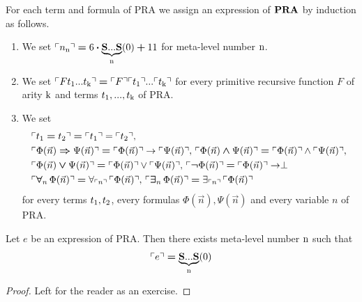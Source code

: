 \documentclass[10pt]{amsart}
\newcommand{\godel}[1]{\ulcorner #1 \urcorner}
\newcommand{\mforall}{\boldsymbol{\forall}}
\newcommand{\mexists}{\boldsymbol{\exists}}
\newcommand{\mra}{\boldsymbol{\Rightarrow}}
\newcommand{\mand}{\boldsymbol{\wedge}}
\newcommand{\mor}{\boldsymbol{\vee}}
\newcommand{\mneg}{\boldsymbol{\neg}}
\newcommand{\meq}{\boldsymbol{=}}
\newcommand{\mplus}{\boldsymbol{+}}
\newcommand{\mdot}{\boldsymbol{\cdot}}
\begin{document}
\begin{definition}
	For each term and formula of $\mathrm{PRA}$ we assign an expression of $\mathbf{PRA}$ by induction as follows.
	\begin{enumerate}[label=\textbf{(\arabic*)}, leftmargin=3.0em]
		\item We set $\godel{n_{\rm{n}}} \meq 6\mdot \underbrace{\bd{S}...\bd{S}}_{\rm{n}}(0) \mplus 11$ for meta-level number $\rm{n}$.
		\item We set $\godel{Ft_{\rm{1}}...t_{\rm{k}}} \meq \godel{F}\godel{t_{\rm{1}}}...\godel{t_{\rm{k}}}$ for every primitive recursive function $F$ of arity $\rm{k}$ and terms $t_{\rm{1}},...,t_{\rm{k}}$ of $\mathrm{PRA}$.
		\item We set
		      $$\begin{aligned}[t]
				       & \godel{t_{\rm{1}} \meq t_{\rm{2}}} \meq \godel{t_{\rm{1}}}=\godel{t_{\rm{2}}},                                                                                                                   \\
				       & \godel{\Phi(\vec{n})\mra \Psi(\vec{n})} \meq \godel{\Phi(\vec{n})}\ra \godel{\Psi(\vec{n})},\,\godel{\Phi(\vec{n}) \mand \Psi(\vec{n})} \meq \godel{\Phi(\vec{n})} \wedge \godel{\Psi(\vec{n})}, \\
				       & \godel{\Phi(\vec{n}) \mor \Psi(\vec{n})} \meq \godel{\Phi(\vec{n})} \vee \godel{\Psi(\vec{n})},\,\godel{\mneg \Phi(\vec{n})} \meq \godel{\Phi(\vec{n})} \ra \perp                                \\
				       & \godel{\mforall_n\,\Phi(\vec{n})} \meq \forall_{\godel{n}}\,\godel{\Phi(\vec{n})},\,\godel{\mexists_n\,\Phi(\vec{n})} \meq \exists_{\godel{n}}\,\godel{\Phi(\vec{n})}                            \\
			      \end{aligned}$$
		      for every terms $t_{\rm{1}},t_{\rm{2}}$, every formulas $\Phi(\vec{n}),\Psi(\vec{n})$ and every variable $n$ of $\mathrm{PRA}$.
	\end{enumerate}
\end{definition}

\begin{fact}\label{fact:each_godel_code_is_meta_numeral}
	Let $e$ be an expression of $\mathrm{PRA}$. Then there exists meta-level number $\rm{n}$ such that
	$$\godel{e} \meq \underbrace{\bd{S}...\bd{S}}_{\rm{n}}(0)$$
\end{fact}
\begin{proof}
	Left for the reader as an exercise.
\end{proof}
\end{document}
